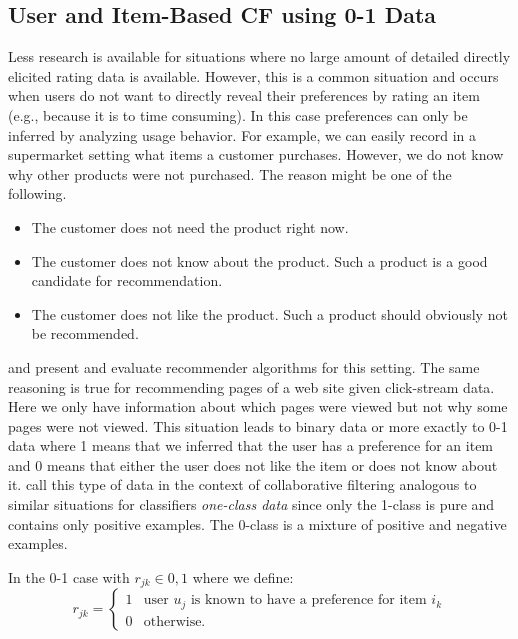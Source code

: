\documentclass[nojss]{jss}
\begin{document}
\subsection{User and Item-Based CF using 0-1 Data}

Less research
is available for situations where no large amount of detailed
directly elicited rating data is available.
However, this is a common situation and occurs when
users do not want to directly reveal their preferences by rating an item
(e.g., because it is to time consuming). In
this case preferences can only be inferred by analyzing usage behavior.
For
example, we can easily record in a supermarket setting what items a customer
purchases. However, we do not know why other products were not purchased.
The reason might be one of the following.
\begin{itemize}
\item The customer does not need the product right now.
\item The customer does not know about the product. Such a product
is a good candidate for recommendation.
\item The customer does not like the product. Such a product should
obviously not
be recommended.
\end{itemize}

\cite{recommender:Mild:2003} and \cite{recommender:Lee:2005}
present and evaluate
recommender algorithms for this setting.
The same reasoning is true for
recommending pages of a web site given click-stream data. Here we only have
information about which pages were viewed but not why some pages were not
viewed. This situation leads to
binary data or more exactly to
0-1 data where 1 means that we inferred that
the user has a preference for an item and 0 means that either the user does not like the item or does not know about it.
\cite{recommender:Pan:2008} call
this type of data in the context of collaborative filtering
analogous to similar situations for classifiers
\emph{one-class data} since only the 1-class is pure and contains only
positive examples. The 0-class is a mixture of positive and negative examples.


In the 0-1 case with $r_{jk} \in {0,1}$ where we define:
\begin{equation}
r_{jk}=
\begin{cases}
1& \text{user $u_j$ is known to have a preference for item $i_k$} \\
0& \text{otherwise.}
\end{cases}
\end{equation}
\end{document}
